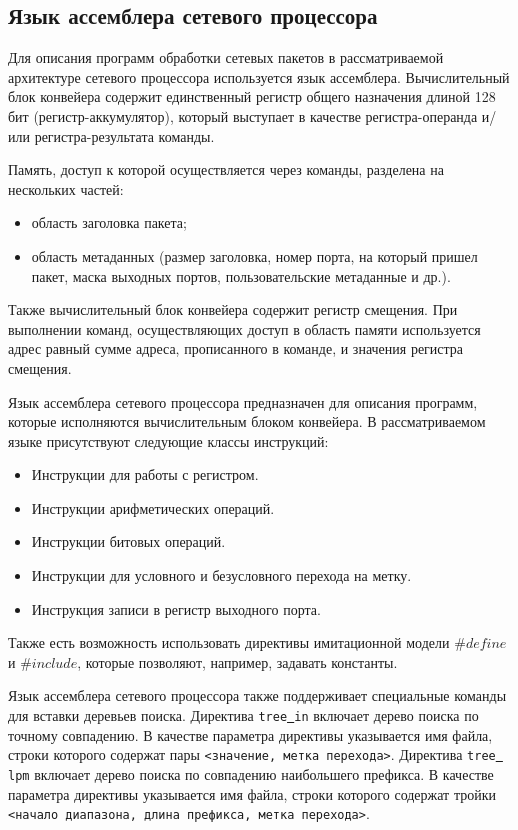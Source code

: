 \documentclass[oneside,final,12pt]{extarticle}
\begin{document}
        \subsection{Язык ассемблера сетевого процессора}
            \label{sect:asm}
            Для описания программ обработки сетевых пакетов в рассматриваемой архитектуре сетевого процессора используется язык ассемблера.
            Вычислительный блок конвейера содержит единственный регистр общего назначения длиной 128 бит (регистр-аккумулятор), который выступает в качестве регистра-операнда и/или регистра-результата команды.

            Память, доступ к которой осуществляется через команды, разделена на нескольких частей:
            \begin{itemize}
                \item область заголовка пакета;
                \item область метаданных (размер заголовка, номер порта, на который пришел пакет, маска выходных портов, пользовательские метаданные и др.).
            \end{itemize}

            Также вычислительный блок конвейера содержит регистр смещения. При выполнении команд, 
            осуществляющих доступ в область памяти используется адрес равный сумме адреса, 
            прописанного в команде, и значения регистра смещения.

            Язык ассемблера сетевого процессора предназначен для описания программ, 
            которые исполняются вычислительным блоком конвейера. 
            В рассматриваемом языке присутствуют следующие классы инструкций:
            \begin{itemize}
                \item Инструкции для работы с регистром.
                \item Инструкции арифметических операций.
                \item Инструкции битовых операций.
                \item Инструкции для условного и безусловного перехода на метку.
                \item Инструкция записи в регистр выходного порта.
            \end{itemize}
            Также есть возможность использовать директивы имитационной модели $\#define$ и $\#include$, 
            которые позволяют, например, задавать константы.
           
            Язык ассемблера сетевого процессора также поддерживает специальные команды 
            для вставки деревьев поиска. Директива \texttt{tree\underline{ }in} включает дерево 
            поиска по точному совпадению. В качестве параметра директивы указывается имя файла, 
            строки которого содержат пары \texttt{<значение, метка перехода>}. 
            Директива \texttt{tree\underline{ }lpm} включает дерево поиска по совпадению наибольшего 
            префикса. В качестве параметра директивы указывается имя файла, 
            строки которого содержат тройки \texttt{<начало диапазона, длина префикса, метка перехода>}.
\end{document}
